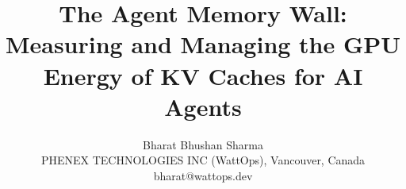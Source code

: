 \documentclass[10pt,twocolumn]{article}
\title{\Large\bfseries The Agent Memory Wall:\\ Measuring and Managing the GPU Energy of KV Caches for AI Agents}
\author{Bharat Bhushan Sharma\\ \small PHENEX TECHNOLOGIES INC (WattOps), Vancouver, Canada\\ \small bharat@wattops.dev}
\date{}
\begin{document}
\maketitle

















\appendix
\onecolumn

\end{document}
